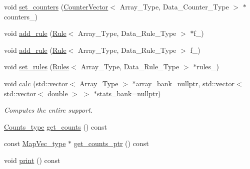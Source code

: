 \begin{DoxyCompactItemize}
\item 
void \hyperlink{classbarry_1_1_support_aa6070db8aa83e220b8c9a1d80dfb57c0}{set\+\_\+counters} (\hyperlink{classbarry_1_1_counter_vector}{Counter\+Vector}$<$ Array\+\_\+\+Type, Data\+\_\+\+Counter\+\_\+\+Type $>$ $\ast$counters\+\_\+)
\item 
void \hyperlink{classbarry_1_1_support_a3113a4586c541aa25db7b4a864b748a2}{add\+\_\+rule} (\hyperlink{classbarry_1_1_rule}{Rule}$<$ Array\+\_\+\+Type, Data\+\_\+\+Rule\+\_\+\+Type $>$ $\ast$f\+\_\+)
\item 
void \hyperlink{classbarry_1_1_support_aa817cb5d6c48dda3ecfeef2c5897b537}{add\+\_\+rule} (\hyperlink{classbarry_1_1_rule}{Rule}$<$ Array\+\_\+\+Type, Data\+\_\+\+Rule\+\_\+\+Type $>$ f\+\_\+)
\item 
void \hyperlink{classbarry_1_1_support_a66dc1a0e7097d547ea9c84df777ad477}{set\+\_\+rules} (\hyperlink{classbarry_1_1_rules}{Rules}$<$ Array\+\_\+\+Type, Data\+\_\+\+Rule\+\_\+\+Type $>$ $\ast$rules\+\_\+)
\item 
void \hyperlink{classbarry_1_1_support_afa36b8c1348e28c51296379157f58081}{calc} (std\+::vector$<$ Array\+\_\+\+Type $>$ $\ast$array\+\_\+bank=nullptr, std\+::vector$<$ std\+::vector$<$ double $>$ $>$ $\ast$stats\+\_\+bank=nullptr)
\begin{DoxyCompactList}\small\item\em Computes the entire support. \end{DoxyCompactList}\item 
\hyperlink{namespacebarry_a3e2d8c3b6cf602107559d4237d9f1315}{Counts\+\_\+type} \hyperlink{classbarry_1_1_support_a5d93a94eaed9b1157fb934284883fd47}{get\+\_\+counts} () const
\item 
const \hyperlink{namespacebarry_a2f0d3aab1d67e4c8eaeab9022e16139f}{Map\+Vec\+\_\+type} $\ast$ \hyperlink{classbarry_1_1_support_abcb4dea3c5a1b140990821900432f90e}{get\+\_\+counts\+\_\+ptr} () const
\item 
void \hyperlink{classbarry_1_1_support_af87b2e85ec72e394387946023508e7fd}{print} () const
\end{DoxyCompactItemize}
